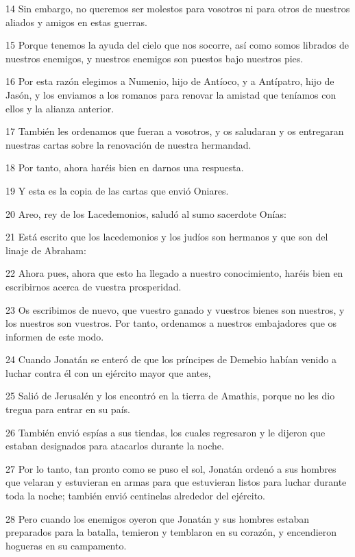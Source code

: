 \par 14 Sin embargo, no queremos ser molestos para vosotros ni para otros de nuestros aliados y amigos en estas guerras.
\par 15 Porque tenemos la ayuda del cielo que nos socorre, así como somos librados de nuestros enemigos, y nuestros enemigos son puestos bajo nuestros pies.
\par 16 Por esta razón elegimos a Numenio, hijo de Antíoco, y a Antípatro, hijo de Jasón, y los enviamos a los romanos para renovar la amistad que teníamos con ellos y la alianza anterior.
\par 17 También les ordenamos que fueran a vosotros, y os saludaran y os entregaran nuestras cartas sobre la renovación de nuestra hermandad.
\par 18 Por tanto, ahora haréis bien en darnos una respuesta.
\par 19 Y esta es la copia de las cartas que envió Oniares.
\par 20 Areo, rey de los Lacedemonios, saludó al sumo sacerdote Onías:
\par 21 Está escrito que los lacedemonios y los judíos son hermanos y que son del linaje de Abraham:
\par 22 Ahora pues, ahora que esto ha llegado a nuestro conocimiento, haréis bien en escribirnos acerca de vuestra prosperidad.
\par 23 Os escribimos de nuevo, que vuestro ganado y vuestros bienes son nuestros, y los nuestros son vuestros. Por tanto, ordenamos a nuestros embajadores que os informen de este modo.
\par 24 Cuando Jonatán se enteró de que los príncipes de Demebio habían venido a luchar contra él con un ejército mayor que antes,
\par 25 Salió de Jerusalén y los encontró en la tierra de Amathis, porque no les dio tregua para entrar en su país.
\par 26 También envió espías a sus tiendas, los cuales regresaron y le dijeron que estaban designados para atacarlos durante la noche.
\par 27 Por lo tanto, tan pronto como se puso el sol, Jonatán ordenó a sus hombres que velaran y estuvieran en armas para que estuvieran listos para luchar durante toda la noche; también envió centinelas alrededor del ejército.
\par 28 Pero cuando los enemigos oyeron que Jonatán y sus hombres estaban preparados para la batalla, temieron y temblaron en su corazón, y encendieron hogueras en su campamento.
